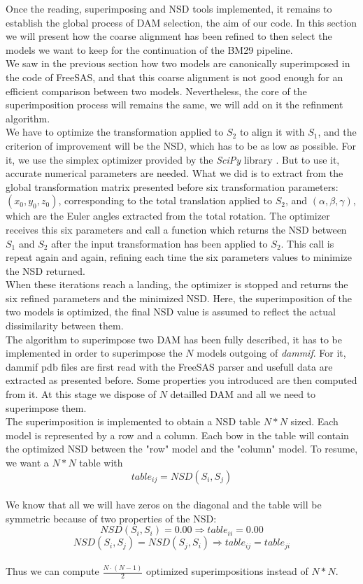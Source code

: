\documentclass[a4paper, 11pt]{report}
\begin{document}
Once the reading, superimposing and NSD tools implemented, it remains 
to establish the global process of DAM selection, the aim of our code. 
In this section we will present how the coarse alignment has been 
refined to then select the models we want to keep for the continuation 
of the BM29 pipeline.\\

We saw in the previous section how two models are canonically 
superimposed in the code of FreeSAS, and that this coarse alignment is 
not good enough for an efficient comparison between two models. 
Nevertheless, the core of the superimposition process will remains the 
same, we will add on it the refinment algorithm.\\
We have to optimize the transformation applied to $S_{2}$ to align it 
with $S_{1}$, and the criterion of improvement will be the NSD, which 
has to be as low as possible. 
For it, we use the simplex optimizer provided by the \textit{SciPy} 
library \cite{scipy}. 
But to use it, accurate numerical parameters are needed. 
What we did is to extract from the global transformation matrix 
presented before six transformation parameters: 
$(x_{0}, y_{0}, z_{0})$, 
corresponding to the total translation applied to $S_{2}$, and 
$(\alpha, \beta, \gamma)$, 
which are the Euler angles extracted from the total rotation. 
The optimizer receives this six parameters and call a function which 
returns the NSD between $S_{1}$ and $S_{2}$ after the input 
transformation has been applied to $S_{2}$. 
This call is repeat again and again, refining each time the six 
parameters values to minimize the NSD returned.\\
When these iterations reach a landing, the optimizer is stopped and 
returns the six refined parameters and the minimized NSD. 
Here, the superimposition of the two models is optimized, the final 
NSD value is assumed to reflect the actual dissimilarity between them.\\

The algorithm to superimpose two DAM has been fully described, it has 
to be implemented in order to superimpose the $N$ models outgoing of 
\textit{dammif}. 
For it, dammif pdb files are first read with the FreeSAS parser and 
usefull data are extracted as presented before. 
Some properties you introduced are then computed from it. 
At this stage we dispose of $N$ detailled DAM and all we need to 
superimpose them.\\
The superimposition is implemented to obtain a NSD table $N*N$ sized. 
Each model is represented by a row and a column. 
Each bow in the table will contain the optimized NSD between the "row" 
model and the "column" model. 
To resume, we want a $N*N$ table with 
\[
table_{ij}=NSD(S_{i},S_{j})
\]\\ 
We know that all we will have zeros on the diagonal and the table will 
be symmetric because of two properties of the NSD:
\[
NSD(S_{i},S_{i})=0.00 \Rightarrow table_{ii}=0.00
\]
\[
NSD(S_{i},S_{j}) = NSD(S_{j},S_{i}) \Rightarrow table_{ij}=table_{ji}
\]\\
Thus we can compute $\frac{N \cdot (N-1)}{2}$ optimized 
superimpositions instead of $N*N$.\\
\end{document}
